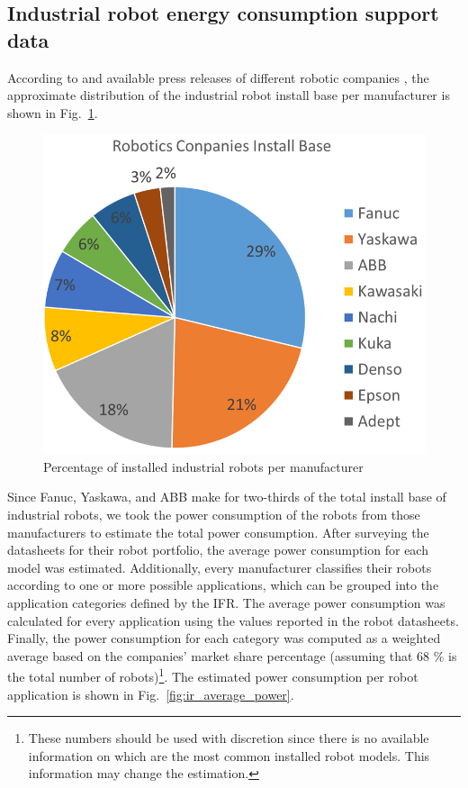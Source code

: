 \begin{appendices}
\section{Industrial robot energy consumption support data}\label{sec:app_robot_ener_consumption}
According to \cite{montaqim2015} and available press releases of different robotic companies \cite{fanuc2015, yaskawa2014, ABB2015}, the approximate distribution of the industrial robot install base per manufacturer is shown in Fig.~\ref{fig:manufacturers_pie}.
\begin{figure}[!ht]
	\centering
	\includegraphics[width=0.95\columnwidth]{fig/manufacturers}
	\caption{Percentage of installed industrial robots per manufacturer}
	\label{fig:manufacturers_pie}
\end{figure}
Since Fanuc, Yaskawa, and ABB make for two-thirds of the total install base of industrial robots, we took the power consumption of the robots from those manufacturers to estimate the total power consumption. 
After surveying the datasheets for their robot portfolio, the average power consumption for each model was estimated. Additionally, every manufacturer classifies their robots according to one or more possible applications, which can be grouped into the application categories defined by the IFR. The average power consumption was calculated for every application using the values reported in the robot datasheets. Finally, the power consumption for each category was computed as a weighted average based on the companies' market share percentage (assuming that 68 \% is the total number of robots)\footnote[1]{These numbers should be used with discretion since there is no available information on which are the most common installed robot models. This information may change the estimation.}. The estimated power consumption per robot application is shown in Fig.~\ref{fig:ir_average_power}.

\end{appendices}
